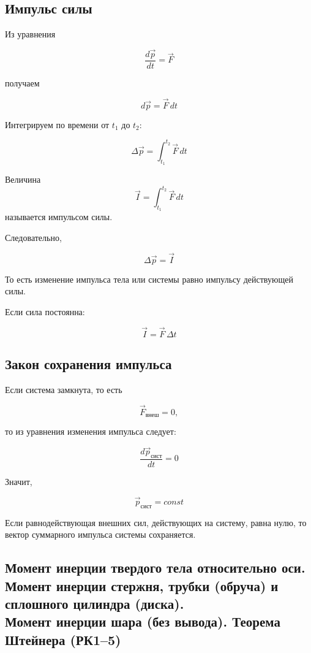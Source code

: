 \documentclass[a4paper,12pt]{article}
\begin{document}
\subsection*{Импульс силы}

Из уравнения

\[
\frac{d\vec p}{dt} = \vec F
\]

получаем

\[
d\vec p = \vec F \, dt
\]

Интегрируем по времени от $t_1$ до $t_2$:

\[
\Delta \vec p
=
\int_{t_1}^{t_2} \vec F \, dt
\]

\begin{definitionbox}
Величина
\[
\vec I
=
\int_{t_1}^{t_2} \vec F \, dt
\]
называется импульсом силы.
\end{definitionbox}

Следовательно,

\[
\Delta \vec p = \vec I
\]

То есть изменение импульса тела или системы равно импульсу действующей силы.

Если сила постоянна:

\[
\vec I = \vec F \, \Delta t
\]

\vspace{0.8em}

\subsection*{Закон сохранения импульса}

Если система замкнута, то есть

\[
\vec F_{\text{внеш}} = 0,
\]

то из уравнения изменения импульса следует:

\[
\frac{d\vec p_{\text{сист}}}{dt} = 0
\]

Значит,

\[
\vec p_{\text{сист}} = const
\]


\begin{theorembox}
Если равнодействующая внешних сил, действующих на систему, равна нулю, то вектор суммарного импульса системы сохраняется.
\end{theorembox}

\vspace{0.8em}
 
\subsection[
Момент инерции твердого тела относительно оси. Момент инерции стержня, трубки (обруча) и сплошного цилиндра (диска). Момент инерции шара (без вывода). Теорема Штейнера (РК1--5)
]{
Момент инерции твердого тела относительно оси.\\
Момент инерции стержня, трубки (обруча) и сплошного цилиндра (диска).\\
Момент инерции шара (без вывода). Теорема Штейнера (РК1--5)
}
\end{document}

